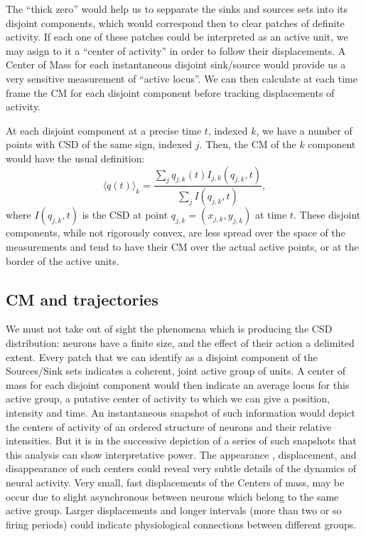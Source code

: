 \documentclass{article}
\begin{document}
The ``thick zero'' would help us to sepparate the sinks and sources sets into its disjoint components, which would correspond then to clear patches of definite activity. If each one of these patches could be interpreted as an active unit, we may asign to it a ``center of activity'' in order to follow their displacements. A Center of Mass for each instantaneous disjoint sink/source would provide us a very sensitive measurement of ``active locus''. We can then calculate at each time frame the CM for each disjoint component before tracking displacements of activity.

At each disjoint component at a precise time $t$, indexed $k$, we have a number of points with CSD of the same sign, indexed $j$. Then, the CM of the $k$ component would have the usual definition:
\begin{equation}\label{cmparadisj}
   \langle q(t) \rangle_k =\frac{\sum_j q_{j,k} (t) I_{j,k} (q_{j,k},t)}
           {\sum_j I(q_{j,k},t)},
\end{equation}
where $I(q_{j,k},t)$ is the CSD at point $q_{j,k}=(x_{j,k}, y_{j,k})$ at time $t$. These disjoint components, while not rigorously convex, are less spread over the space of the measurements and tend to have their CM over the actual active points, or at the border of the active units. 

\subsection{CM and trajectories}

We must not take out of sight the phenomena which is producing the CSD distribution: neurons have a finite size, and the effect of their action a delimited extent. Every patch that we can identify as a disjoint component of the Sources/Sink sets indicates a coherent, joint active group of units. A center of mass for each disjoint component would then indicate an average locus for this active group, a putative center of activity to which we can give a position, intensity and time. An instantaneous snapshot of such information would depict the centers of activity of an ordered structure of neurons and their relative intensities. But it is in the successive depiction of a series of such snapshots that this analysis can show interpretative power. The appearance , displacement, and disappearance of such centers could reveal very subtle details of the dynamics of neural activity. Very small, fast displacements of the Centers of mass, may be occur due to slight asynchronous between neurons which belong to the same active group. Larger displacements and  longer intervals (more than two or so firing periods) could indicate physiological connections between different groups.
\end{document}
